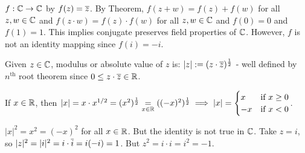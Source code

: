 \documentclass[]{article}
\begin{document}
\begin{remark}
	$f:\mathbb{C}\rightarrow \mathbb{C}$ by $f(z) = \overline{z}$. By Theorem, $f(z+w) = f(z)+f(w)$ for all $z,w\in\mathbb{C}$ and $f(z\cdot w) = f(z)\cdot f(w)$ for all $z,w\in\mathbb{C}$ and $f(0) = 0$ and $f(1) = 1$. This implies conjugate preserves field properties of $\mathbb{C}$. However, $f$ is not an identity mapping since $f(i) = -i$.
\end{remark}
\begin{definition}
	 Given $z\in\mathbb{C}$, modulus or absolute value of $z$ is: $|z|:=(z\cdot \overline{z})^\frac{1}{2}$ - well defined by $n^\text{th}$ root theorem since $0\leq z\cdot \overline{z}\in \mathbb{R}$.
\end{definition}
\begin{note}
	If $x\in\mathbb{R}$, then $|x| = x\cdot x^{1/2} = (x^2)^\frac{1}{2} \underset{x\in\mathbb{R}}{=} ((-x)^2)^\frac{1}{2} \implies |x| = \begin{cases} x & \text{if } x\geq 0\\ -x & \text{if } x<0\end{cases}$.
\end{note}
\begin{observe}
	$|x|^2 = x^2 = (-x)^2$ for all $x\in\mathbb{R}$. But the identity is not true in $\mathbb{C}$. Take $z = i$, so $|z|^2 = |i|^2 = i\cdot\overline{i} = i(-i) = 1$. But $z^2 = i\cdot i = i^2 = -1$.
\end{observe}
\end{document}
